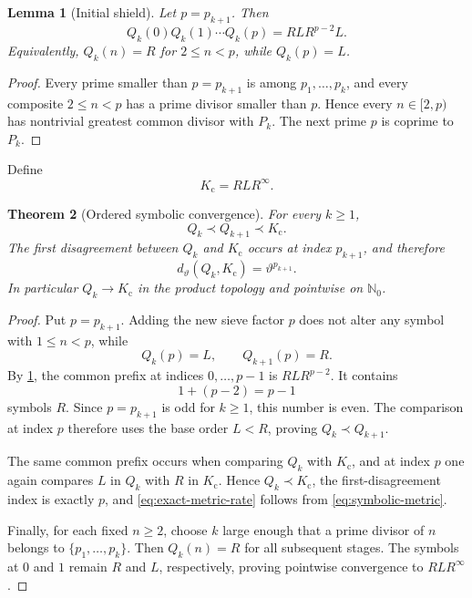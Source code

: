 \documentclass[11pt]{article}
\newtheorem{theorem}{Theorem}[section]
\newtheorem{lemma}[theorem]{Lemma}
\theoremstyle{definition}
\theoremstyle{remark}
\newcommand{\N}{\mathbb{N}}
\newcommand{\Kc}{K_{\mathrm c}}
\begin{document}
\begin{lemma}[Initial shield]\label{lem:initial-shield}
Let $p=p_{k+1}$.  Then
\begin{equation}\label{eq:initial-shield}
    Q_k(0)Q_k(1)\cdots Q_k(p)
    =RLR^{p-2}L.
\end{equation}
Equivalently, $Q_k(n)=R$ for $2\le n<p$, while $Q_k(p)=L$.
\end{lemma}

\begin{proof}
Every prime smaller than $p=p_{k+1}$ is among $p_1,\ldots,p_k$, and every composite $2\le n<p$ has a prime divisor smaller than $p$.  Hence every $n\in[2,p)$ has nontrivial greatest common divisor with $P_k$.  The next prime $p$ is coprime to $P_k$.
\end{proof}

Define
\begin{equation}\label{eq:Kc-word}
    \Kc=RLR^\infty.
\end{equation}

\begin{theorem}[Ordered symbolic convergence]\label{thm:ordered-convergence}
For every $k\ge1$,
\begin{equation}\label{eq:ordered-chain}
    Q_k\prec Q_{k+1}\prec\Kc.
\end{equation}
The first disagreement between $Q_k$ and $\Kc$ occurs at index $p_{k+1}$, and therefore
\begin{equation}\label{eq:exact-metric-rate}
    d_\vartheta(Q_k,\Kc)=\vartheta^{p_{k+1}}.
\end{equation}
In particular $Q_k\to\Kc$ in the product topology and pointwise on $\N_0$.
\end{theorem}

\begin{proof}
Put $p=p_{k+1}$.  Adding the new sieve factor $p$ does not alter any symbol with $1\le n<p$, while
\[
    Q_k(p)=L,\qquad Q_{k+1}(p)=R.
\]
By \cref{lem:initial-shield}, the common prefix at indices $0,\ldots,p-1$ is $RLR^{p-2}$.  It contains
\[
    1+(p-2)=p-1
\]
symbols $R$.  Since $p=p_{k+1}$ is odd for $k\ge1$, this number is even.  The comparison at index $p$ therefore uses the base order $L<R$, proving $Q_k\prec Q_{k+1}$.

The same common prefix occurs when comparing $Q_k$ with $\Kc$, and at index $p$ one again compares $L$ in $Q_k$ with $R$ in $\Kc$.  Hence $Q_k\prec\Kc$, the first-disagreement index is exactly $p$, and \eqref{eq:exact-metric-rate} follows from \eqref{eq:symbolic-metric}.

Finally, for each fixed $n\ge2$, choose $k$ large enough that a prime divisor of $n$ belongs to $\{p_1,\ldots,p_k\}$.  Then $Q_k(n)=R$ for all subsequent stages.  The symbols at $0$ and $1$ remain $R$ and $L$, respectively, proving pointwise convergence to $RLR^\infty$.
\end{proof}
\end{document}
